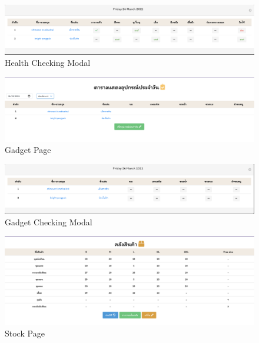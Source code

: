 \begin{figure}
  \begin{center}
  \includegraphics[width=\linewidth]{images/checkHealth.png}
  \end{center}
  \caption[Poem]{Health Checking Modal}
  \label{fig:CheckHealth}
  \end{figure}

\begin{figure}
  \begin{center}
  \includegraphics[width=\linewidth]{images/Gadget.png}
  \end{center}
  \caption[Poem]{Gadget Page}
  \label{fig:Gadget}
  \end{figure}

\begin{figure}
  \begin{center}
  \includegraphics[width=\linewidth]{images/checkGadget.png}
  \end{center}
  \caption[Poem]{Gadget Checking Modal}
  \label{fig:CheckGadget}
  \end{figure}

\begin{figure}
  \begin{center}
  \includegraphics[width=\linewidth]{images/Stock.png}
  \end{center}
  \caption[Poem]{Stock Page}
  \label{fig:Stock}
  \end{figure}

